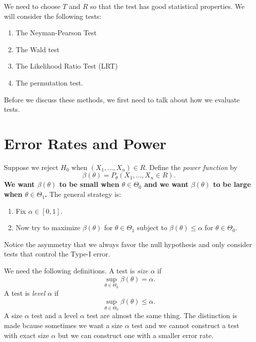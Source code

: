 \documentclass[twoside,12pt]{article}
\begin{document}
We need to choose $T$ and $R$
so that the test has good statistical properties.
We will consider the following tests:
\begin{enumerate}
\item The Neyman-Pearson Test
\item The Wald test
\item The Likelihood Ratio Test (LRT)
\item The permutation test.
\end{enumerate}

Before we discuss these methods, we first need to talk about 
how we evaluate tests.



\section{Error Rates and Power}


Suppose we reject $H_0$ when $(X_1,\ldots, X_n)\in R$.
Define the {\em power function} by
$$
\beta(\theta) = P_\theta(X_1,\ldots, X_n\in R).
$$
{\bf We want $\beta(\theta)$ to be small when $\theta\in\Theta_0$ and
we want $\beta(\theta)$ to be large when $\theta\in\Theta_1$.}
The general strategy is: 
\begin{enumerate}
\item Fix $\alpha\in[0,1]$. 
\item Now try to maximize
$\beta(\theta)$ for $\theta\in \Theta_1$ subject to
$\beta(\theta)\leq \alpha$ for $\theta\in \Theta_0$.
\end{enumerate}
Notice the asymmetry that we always favor the null hypothesis and only consider tests that control the Type-I error.

We need the following definitions.
A test is {\em size $\alpha$} if
$$
\sup_{\theta\in\Theta_0}\beta(\theta) = \alpha.
$$
A test is {\em level $\alpha$} if
$$
\sup_{\theta\in\Theta_0}\beta(\theta) \leq \alpha.
$$
A size $\alpha$ test and a level $\alpha$ test are almost the same thing.
The distinction is made bcause sometimes we want a size $\alpha$ test
and we cannot construct a test with exact size $\alpha$ but we can
construct one with a smaller error rate.
\end{document}
